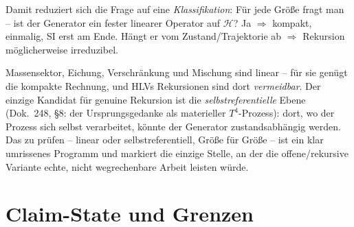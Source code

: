 Damit reduziert sich die Frage auf eine \emph{Klassifikation}: Für jede Größe
fragt man -- ist der Generator ein fester linearer Operator auf $\mathcal{H}$?
Ja $\Rightarrow$ kompakt, einmalig, SI erst am Ende. Hängt er vom
Zustand/Trajektorie ab $\Rightarrow$ Rekursion möglicherweise irreduzibel.

Massensektor, Eichung, Verschränkung und Mischung sind linear -- für sie genügt
die kompakte Rechnung, und HLVs Rekursionen sind dort \emph{vermeidbar}. Der
einzige Kandidat für genuine Rekursion ist die \emph{selbstreferentielle} Ebene
(Dok.~248, §8: der Ursprungsgedanke als materieller $T^4$-Prozess): dort, wo der
Prozess sich selbst verarbeitet, könnte der Generator zustandsabhängig werden.
Das zu prüfen -- linear oder selbstreferentiell, Größe für Größe -- ist ein klar
umrissenes Programm und markiert die einzige Stelle, an der die offene/rekursive
Variante echte, nicht wegrechenbare Arbeit leisten würde.

\section{Claim-State und Grenzen}

